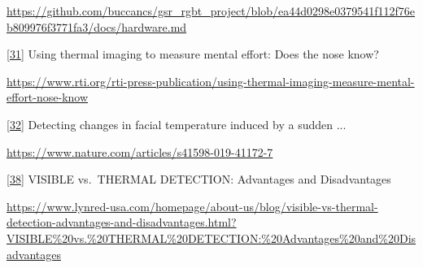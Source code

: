 \documentclass[12pt,a4paper]{article}
\begin{document}
\url{https://github.com/buccancs/gsr_rgbt_project/blob/ea44d0298e0379541f112f76eb809976f3771fa3/docs/hardware.md}

\href{https://www.rti.org/rti-press-publication/using-thermal-imaging-measure-mental-effort-nose-know\#:~:text=Using\%20thermal\%20imaging\%20to\%20measure,Temperature\%20change}{{[}31{]}} Using thermal imaging to measure mental effort: Does the nose know?

\url{https://www.rti.org/rti-press-publication/using-thermal-imaging-measure-mental-effort-nose-know}

\href{https://www.nature.com/articles/s41598-019-41172-7\#:~:text=,decreased\%20after\%20the\%20auditory\%20stimulus}{{[}32{]}} Detecting changes in facial temperature induced by a sudden ...

\url{https://www.nature.com/articles/s41598-019-41172-7}

\href{https://www.lynred-usa.com/homepage/about-us/blog/visible-vs-thermal-detection-advantages-and-disadvantages.html?VISIBLE\%20vs.\%20THERMAL\%20DETECTION:\%20Advantages\%20and\%20Disadvantages\#:~:text=VISIBLE\%20vs,other\%20words\%2C\%20performance\%20is}{{[}38{]}} VISIBLE vs.~THERMAL DETECTION: Advantages and Disadvantages

\url{https://www.lynred-usa.com/homepage/about-us/blog/visible-vs-thermal-detection-advantages-and-disadvantages.html?VISIBLE\%20vs.\%20THERMAL\%20DETECTION:\%20Advantages\%20and\%20Disadvantages}
\end{document}
